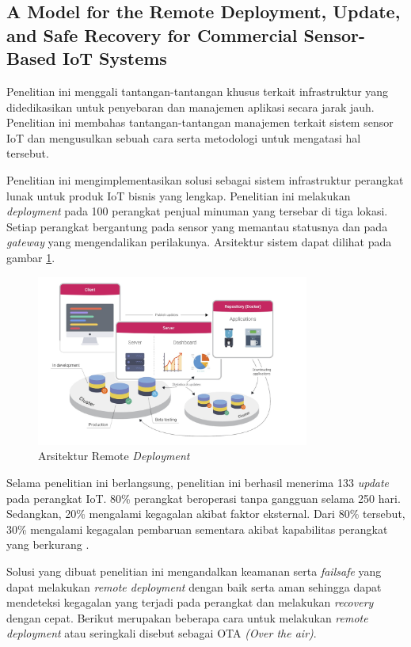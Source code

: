 \subsection{A Model for the Remote Deployment, Update, and Safe Recovery for Commercial Sensor-Based IoT Systems}
Penelitian ini menggali tantangan-tantangan khusus terkait infrastruktur yang didedikasikan untuk penyebaran dan manajemen aplikasi secara jarak jauh. Penelitian ini membahas tantangan-tantangan manajemen terkait sistem sensor IoT dan mengusulkan sebuah cara serta metodologi untuk mengatasi hal tersebut.

Penelitian ini mengimplementasikan solusi sebagai sistem infrastruktur perangkat lunak untuk produk IoT bisnis yang lengkap. Penelitian ini melakukan \textit{deployment} pada 100 perangkat penjual minuman yang tersebar di tiga lokasi. Setiap perangkat bergantung pada sensor yang memantau statusnya dan pada \textit{gateway} yang mengendalikan perilakunya. Arsitektur sistem dapat dilihat pada gambar \ref{fig:architecture-remote-deployments}.

\begin{figure}[ht]
  \centering
  \includegraphics[width=0.8\textwidth]{resources/chapter-2/arsitektur-remote-deployment.jpg}
  \caption{Arsitektur Remote \textit{Deployment} \parencite{RemoteDeployment}}
  \label{fig:architecture-remote-deployments}
\end{figure}

Selama penelitian ini berlangsung, penelitian ini berhasil menerima 133 \textit{update} pada perangkat IoT. 80\% perangkat beroperasi tanpa gangguan selama 250 hari. Sedangkan, 20\% mengalami kegagalan akibat faktor eksternal. Dari 80\% tersebut, 30\% mengalami kegagalan pembaruan sementara akibat kapabilitas perangkat yang berkurang \parencite{RemoteDeployment}.

Solusi yang dibuat penelitian ini mengandalkan keamanan serta \textit{failsafe} yang dapat melakukan \textit{remote deployment} dengan baik serta aman sehingga dapat mendeteksi kegagalan yang terjadi pada perangkat dan melakukan \textit{recovery} dengan cepat. Berikut merupakan beberapa cara untuk melakukan \textit{remote deployment} atau seringkali disebut sebagai OTA \textit{(Over the air)}.

